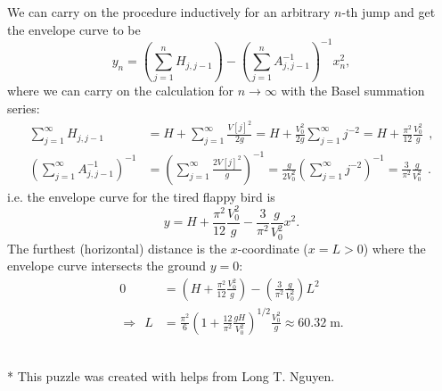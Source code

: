 \begin{solution}
We can carry on the procedure inductively for an arbitrary $n$-th jump and get the envelope curve to be
\[y_n=\left(\sum_{j=1}^{n}H_{j,j-1}\right)-\left(\sum_{j=1}^{n}A_{j,j-1}^{-1}\right)^{-1}x_n^2,\]
where we can carry on the calculation for $n\rightarrow \infty$ with the Basel summation series:
\begin{equation}
\begin{split}
\sum^{\infty}_{j=1} H_{j,j-1} &= H + \sum^{\infty}_{j=1}\frac{V[j]^2}{2g} = H + \frac{V_0^2}{2g} \sum^{\infty}_{j=1} j^{-2} = H + \frac{\pi^2}{12} \frac{V_0^2}{g} \ \ ,
\\
\left( \sum^{\infty}_{j=1} A_{j,j-1}^{-1} \right)^{-1} &= \left( \sum^{\infty}_{j=1} \frac{2V[j]^2}{g} \right)^{-1} = \frac{g}{2V_0^2}\left( \sum^{\infty}_{j=1} j^{-2} \right)^{-1} = \frac{3}{\pi^2} \frac{g}{V_0^2} \ \ .
\end{split}
\end{equation}
i.e. the envelope curve for the tired flappy bird is
\[y=H+\frac{\pi^2}{12}\frac{V_0^2}{g}-\frac{3}{\pi^2}\frac{g}{V_0^2}x^2.\]
The furthest (horizontal) distance is the $x$-coordinate ($x=L>0$) where the envelope curve intersects the ground $y=0$:
\begin{equation}
\begin{split}
0&=\left( H + \frac{\pi^2}{12} \frac{V_0^2}{g} \right) - \left( \frac{3}{\pi^2} \frac{g}{V_0^2} \right) L^2
\\
\Longrightarrow \ \ L &= \frac{\pi^2}{6} \left(1 + \frac{12}{\pi^2} \frac{gH}{V_0^2} \right)^{1/2} \frac{V_0^2}{g} \approx \boxed{60.32\;\mathrm{m}}.
\end{split}
\end{equation}
\ \ 


* This puzzle was created with helps from Long T. Nguyen.

\end{solution}